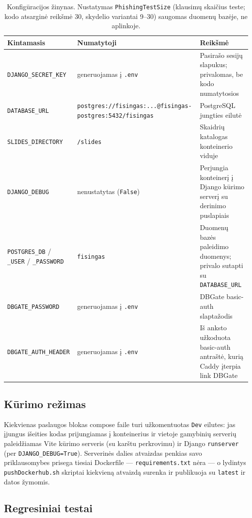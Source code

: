 \documentclass[11pt,a4paper]{article}
\newcommand{\code}[1]{\texttt{#1}}
\begin{document}
\begin{table}[h]
\centering
\small
\begin{tabular}{@{}llp{6.0cm}@{}}
\toprule
\textbf{Kintamasis} & \textbf{Numatytoji} & \textbf{Reikšmė} \\
\midrule
\code{DJANGO\_SECRET\_KEY} & generuojamas į \code{.env} & Pasirašo sesijų slapukus; privalomas, be kodo numatytosios \\
\code{DATABASE\_URL}       & \code{postgres://fisingas:...@fisingas-postgres:5432/fisingas} & PostgreSQL jungties eilutė \\
\code{SLIDES\_DIRECTORY}   & \code{/slides}   & Skaidrių katalogas konteinerio viduje \\
\code{DJANGO\_DEBUG}       & nenustatytas (\code{False}) & Perjungia konteinerį į Django kūrimo serverį su derinimo puslapiais \\
\code{POSTGRES\_DB} / \code{\_USER} / \code{\_PASSWORD} & \code{fisingas} & Duomenų bazės paleidimo duomenys; privalo sutapti su \code{DATABASE\_URL} \\
\code{DBGATE\_PASSWORD}    & generuojamas į \code{.env} & DBGate basic-auth slaptažodis \\
\code{DBGATE\_AUTH\_HEADER} & generuojamas į \code{.env} & Iš anksto užkoduota basic-auth antraštė, kurią Caddy įterpia link DBGate \\
\bottomrule
\end{tabular}
\caption{Konfigūracijos žinynas. Nustatymas \code{PhishingTestSize}
(klausimų skaičius teste; kodo atsarginė reikšmė 30, skydelio
variantai 9--30) saugomas duomenų bazėje, ne aplinkoje.}
\label{tab:config}
\end{table}

\subsection{Kūrimo režimas}

Kiekvienas paslaugos blokas compose faile turi užkomentuotas
\code{Dev} eilutes: jas įjungus išeities kodas prijungiamas į
konteinerius ir vietoje gamybinių serverių paleidžiamas Vite kūrimo
serveris (su karštu perkrovimu) ir Django \code{runserver} (per
\code{DJANGO\_DEBUG=True}). Serverinės dalies atvaizdas penkias savo
priklausomybes prisega tiesiai Dockerfile — \code{requirements.txt}
nėra — o lydintys \code{pushDockerhub.sh} skriptai kiekvieną atvaizdą
surenka ir publikuoja su \code{latest} ir datos žymomis.

\subsection{Regresiniai testai}
\end{document}
